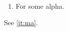 \documentclass{article}
\makeatletter
\newcommand{\mylabel}[2]{\addtocounter{\@listctr}{-1}\refstepcounter{\@listctr}#2\def\@currentlabel{#2}\label{#1}}
\makeatother
\begin{document}
\begin{enumerate}
\item[\mylabel{it:ma}{MA)}] For some alpha.
\end{enumerate}
See \ref{it:ma}.
\end{document}
